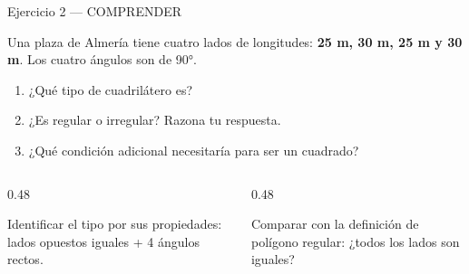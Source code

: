 \documentclass[aspectratio=169, 10pt, spanish]{beamer}
\begin{document}
\begin{frame}{Ejercicio 2 — COMPRENDER }
  \begin{comprenderbox}
    Una plaza de Almería tiene cuatro lados de longitudes:
    \textbf{25 m, 30 m, 25 m y 30 m}. Los cuatro ángulos son de 90°.
    \begin{enumerate}
      \item ¿Qué tipo de cuadrilátero es?
      \item ¿Es regular o irregular? Razona tu respuesta.
      \item ¿Qué condición adicional necesitaría para ser un cuadrado?
    \end{enumerate}
  \end{comprenderbox}
  \vspace{0.2cm}
  \begin{columns}[t]
    \begin{column}{0.48\textwidth}
      \begin{pasobox}[1]
        Identificar el tipo por sus propiedades:
        lados opuestos iguales + 4 ángulos rectos.
      \end{pasobox}
    \end{column}
    \begin{column}{0.48\textwidth}
      \begin{pasobox}[2]
        Comparar con la definición de polígono regular:
        ¿todos los lados son iguales?
      \end{pasobox}
    \end{column}
  \end{columns}
\end{frame}

\end{document}

